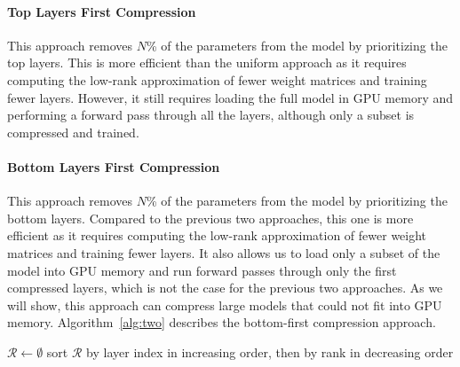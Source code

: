 \paragraph{Top Layers First Compression}
This approach removes $N$\% of the parameters from the model by prioritizing the top layers. This is more efficient than the uniform approach as it requires computing the low-rank approximation of fewer weight matrices and training fewer layers. However, it still requires loading the full model in GPU memory and performing a forward pass through all the layers, although only a subset is compressed and trained.

\paragraph{Bottom Layers First Compression}
This approach removes $N$\% of the parameters from the model by prioritizing the bottom layers. Compared to the previous two approaches, this one is more efficient as it requires computing the low-rank approximation of fewer weight matrices and training fewer layers. It also allows us to load only a subset of the model into GPU memory and run forward passes through only the first compressed layers, which is not the case for the previous two approaches. As we will show, this approach can compress large models that could not fit into GPU memory. Algorithm~\ref{alg:two} describes the bottom-first compression approach.

\begin{algorithm}[!ht]
\small
\caption{Bottom Layers First Compression Algorithm}\label{alg:two}
$\mathcal{R} \gets \emptyset$\;
sort $\mathcal{R}$ by layer index in increasing order, then by rank in decreasing order\;
\;
\end{algorithm}

